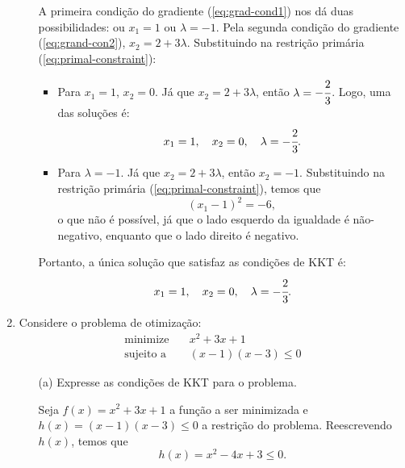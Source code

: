 \documentclass[11pt,a4paper]{article}
\begin{document}
\begin{enumerate}
\begin{itemize}
            A primeira condição do gradiente (\ref{eq:grad-cond1}) nos dá duas possibilidades: ou $x_1 = 1$ ou $\lambda = -1$. Pela segunda condição do gradiente (\ref{eq:grand-con2}), $x_2 = 2 + 3\lambda$. Substituindo na restrição primária (\ref{eq:primal-constraint}):
            \begin{itemize}
                \item Para $x_1 = 1$, $x_2 = 0$. Já que $x_2 = 2 + 3\lambda$, então $\lambda = -\cfrac{2}{3}$. Logo, uma das soluções é:
                \begin{equation*}
                    x_1 = 1, \quad x_2 = 0, \quad \lambda = -\cfrac{2}{3}.
                \end{equation*}
                \item Para $\lambda = -1$. Já que $x_2 = 2 + 3\lambda$, então $x_2 = -1$. Substituindo na restrição primária (\ref{eq:primal-constraint}), temos que
                \begin{equation*}
                    (x_1 - 1)^2 = -6,
                \end{equation*}
                \noindent o que não é possível, já que o lado esquerdo da igualdade é não-negativo, enquanto que o lado direito é negativo.
            \end{itemize}

            Portanto, a única solução que satisfaz as condições de KKT é:
            \begin{equation*}
                x_1 = 1, \quad x_2 = 0, \quad \lambda = -\cfrac{2}{3}.
            \end{equation*}
        \end{itemize}
    \item Considere o problema de otimização:
        \begin{align*}
            \text{minimize} & \quad x^2 + 3x + 1\\
            \text{sujeito a} & \quad (x - 1)(x - 3) \leq 0
        \end{align*}
        \begin{itemize}
            \item[(a)] Expresse as condições de KKT para o problema.
            
            Seja $f(x) = x^2 + 3x + 1$ a função a ser minimizada e $h(x) = (x-1)(x-3) \leq 0$ a restrição do problema. Reescrevendo $h(x)$, temos que
            \begin{equation*}
                h(x) = x^2 - 4x + 3 \leq 0.
            \end{equation*}


\end{itemize}
\end{enumerate}
\end{document}
